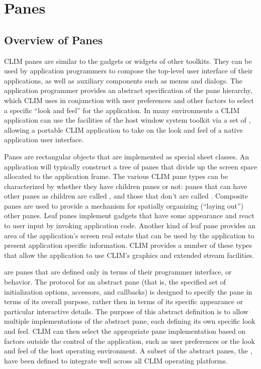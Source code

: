 
\chapter {Panes}
\label {panes}

\section {Overview of Panes}

CLIM panes are similar to the gadgets or widgets of other toolkits.  They can be
used by application programmers to compose the top-level user interface of their
applications, as well as auxiliary components such as menus and dialogs.  The
application programmer provides an abstract specification of the pane hierarchy,
which CLIM uses in conjunction with user preferences and other factors to select
a specific ``look and feel'' for the application.  In many environments a CLIM
application can use the facilities of the host window system toolkit via a set
of , allowing a portable CLIM application to take on the
look and feel of a native application user interface.

Panes are rectangular objects that are implemented as special sheet classes.  An
application will typically construct a tree of panes that divide up the screen
space allocated to the application frame.  The various CLIM pane types can be
characterized by whether they have children panes or not: panes that can have
other panes as children are called , and those that
don't are called .  Composite panes are used to provide a
mechanism for spatially organizing (``laying out'') other panes.  Leaf panes
implement gadgets that have some appearance and react to user input by invoking
application code.  Another kind of leaf pane provides an area of the
application's screen real estate that can be used by the application to present
application specific information.  CLIM provides a number of these
 types that allow the application to use CLIM's
graphics and extended stream facilities.

 are panes that are defined only in terms of their
programmer interface, or behavior.  The protocol for an abstract pane (that
is, the specified set of initialization options, accessors, and callbacks) is
designed to specify the pane in terms of its overall purpose, rather then in
terms of its specific appearance or particular interactive details.  The
purpose of this abstract definition is to allow multiple implementations of
the abstract pane, each defining its own specific look and feel.  CLIM can
then select the appropriate pane implementation based on factors outside the
control of the application, such as user preferences or the look and feel of
the host operating environment.  A subset of the abstract panes, the
, have been defined to integrate well across all CLIM
operating platforms.


